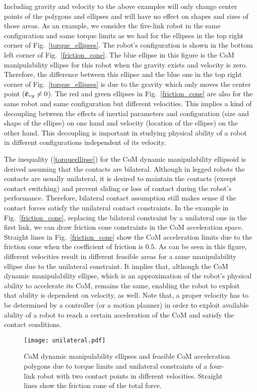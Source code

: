 Including gravity and velocity to the above examples will only change center
points of the polygons and ellipses and will have no effect on shapes and
sizes of those areas.  As an example, we consider the five-link robot in the
same configuration and same torque limits as we had for the ellipses in the
top right corner of Fig.~\ref{torque_ellipses}.  The robot's configuration is
shown in the bottom left corner of Fig.~\ref{friction_cone}.  The blue ellipse
in this figure is the CoM manipulability ellipse for this robot when the
gravity exists and velocity is zero.  Therefore, the difference between this
ellipse and the blue one in the top right corner of Fig.~\ref{torque_ellipses}
is due to the gravity which only moves the center point ($\ddot{\mathbf{c}}_{vg} \neq
0$).  The red and green ellipses in Fig.~\ref{friction_cone} are also for the
same robot and same configuration but different velocities.  This implies a
kind of decoupling between the effects of inertial parameters and
configuration (size and shape of the ellipse) on one hand and velocity
(location of the ellipse) on the other hand.  This decoupling is important in
studying physical ability of a robot in different configurations independent
of its velocity.

The inequality (\ref{torqueellipse}) for the CoM dynamic manipulability
ellipsoid is derived assuming that the contacts are bilateral.  Although in
legged robots the contacts are usually unilateral, it is desired to maintain
the contacts (except contact switching) and prevent sliding or loss of contact
during the robot's performance.  Therefore, bilateral contact assumption still
makes sense if the contact forces satisfy the unilateral contact constraints.
In the example in Fig.~\ref{friction_cone}, replacing the bilateral constraint
by a unilateral one in the first link, we can draw friction cone constraints
in the CoM acceleration space.  Straight lines in Fig.~\ref{friction_cone}
show the CoM acceleration limits due to the friction cone when the coefficient
of friction is $0.5$.  As can be seen in this figure, different velocities
result in different feasible areas for a same manipulability ellipse due to
the unilateral constraint.  It implies that, although the CoM dynamic
manipulability ellipse, which is an approximation of the robot's physical
ability to accelerate its CoM, remains the same, enabling the robot to exploit
that ability is dependent on velocity, as well.  Note that, a proper velocity
has to be determined by a controller (or a motion planner) in order to exploit
available ability of a robot to reach a certain acceleration of the CoM and
satisfy the contact conditions.
%
\begin{figure}
	\centering
	\texttt{[image: unilateral.pdf]}
	\caption{CoM dynamic manipulability ellipses and feasible CoM acceleration
		polygons due to torque limits and unilateral constraints of a four-link
		robot with two contact points in different velocities.  Straight lines
		show the friction cone of the total force.}
	\label{unilateral}
\end{figure}
%

